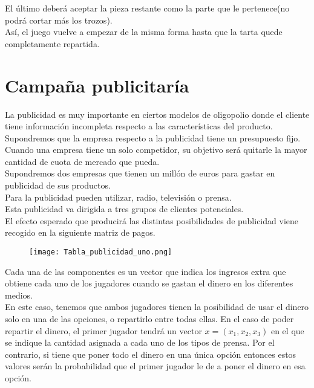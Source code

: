 \documentclass[10pt,a4paper]{book}
\begin{document}
El último deberá aceptar la pieza restante como la parte que le pertenece(no podrá cortar más los trozos).\\
Así, el juego vuelve a empezar de la misma forma hasta que la tarta quede completamente repartida.\\




\section{Campaña publicitaría}


La publicidad es muy importante en ciertos modelos de oligopolio donde el cliente tiene información incompleta respecto a las características del producto.\\

Supondremos que la empresa respecto a la publicidad tiene un presupuesto fijo.\\

Cuando una empresa tiene un solo competidor, su objetivo será quitarle la mayor cantidad de cuota de mercado que pueda.\\

Supondremos dos empresas que tienen un millón de euros para gastar en publicidad de sus productos.\\
Para la publicidad pueden utilizar, radio, televisión o prensa.\\

Esta publicidad va dirigida a tres grupos de clientes potenciales.\\

El efecto esperado que producirá las distintas posibilidades de publicidad viene recogido en la siguiente matriz de pagos.\\



\begin{figure}[htb]
\centering
\texttt{[image: Tabla\_publicidad\_uno.png]}
\end{figure} 

Cada una de las componentes es un vector que indica los ingresos extra que obtiene cada uno de los jugadores cuando se gastan el dinero en los diferentes medios.\\

En este caso, tenemos que ambos jugadores tienen la posibilidad de usar el dinero solo en una de las opciones, o repartirlo entre todas ellas. En el caso de poder repartir el dinero, el primer jugador tendrá un vector $x=(x_1,x_2,x_3)$ en el que se indique la cantidad asignada a cada uno de los tipos de prensa.  Por el contrario, si tiene que poner todo el dinero en una única opción entonces estos valores serán la probabilidad que el primer jugador le de a poner el dinero en esa opción.\\
\end{document}
